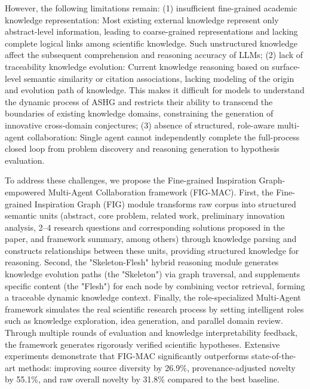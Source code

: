 \documentclass[runningheads]{llncs}
\begin{document}
However, the following limitations remain: (1) insufficient fine-grained academic knowledge representation: Most existing external knowledge represent only abstract-level information,  leading to coarse-grained representations and lacking complete logical links among scientific knowledge. Such unstructured knowledge  affect the subsequent comprehension and reasoning accuracy of LLMs; 
(2) lack of traceability knowledge evolution: Current knowledge reasoning based on surface-level semantic similarity or citation associations, lacking modeling of the origin and evolution path of knowledge. This makes it difficult for models to understand the dynamic process of ASHG and restricts their ability to transcend the boundaries of existing knowledge domains, constraining the generation of innovative cross-domain conjectures;
(3) absence of structured, role-aware multi-agent collaboration: Single agent cannot independently complete the full-process closed loop from problem discovery and reasoning generation to hypothesis evaluation.


To address these challenges, we propose the Fine-grained Inspiration Graph-empowered Multi-Agent Collaboration framework (FIG-MAC). First, the Fine-grained Inspiration Graph (FIG) module transforms raw corpus into structured semantic units (abstract, core problem, related work, preliminary innovation analysis, 2–4 research questions and corresponding solutions proposed in the paper, and framework summary, among others) through knowledge parsing and constructs relationships between these units, providing structured knowledge for reasoning. Second, the "Skeleton-Flesh" hybrid reasoning module generates knowledge evolution paths (the "Skeleton") via graph traversal, and supplements specific content (the "Flesh") for each node by combining vector retrieval, forming a traceable dynamic knowledge context. Finally, the role-specialized Multi-Agent framework simulates the real scientific research process by setting intelligent roles such as knowledge exploration, idea generation, and parallel domain review. Through multiple rounds of evaluation and knowledge interpretability feedback, the framework generates rigorously verified scientific hypotheses. Extensive experiments demonstrate that FIG-MAC significantly outperforms state-of-the-art methods: improving source diversity by 26.9\%, provenance-adjusted novelty by 55.1\%, and raw overall novelty by 31.8\% compared to the best baseline.
\end{document}
